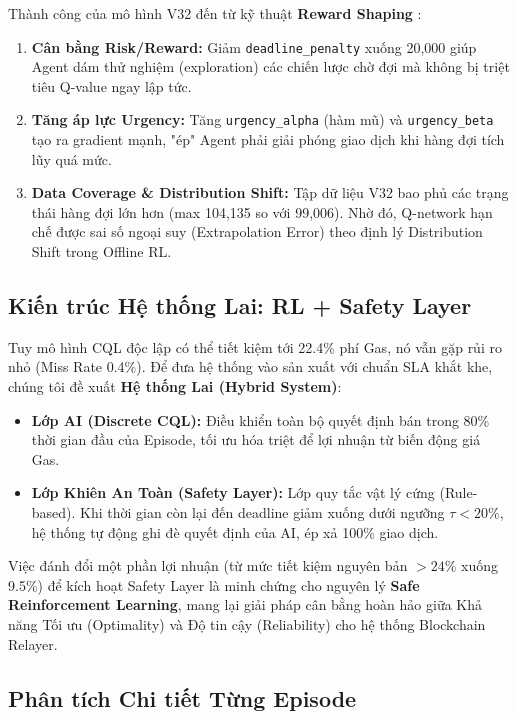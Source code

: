 Thành công của mô hình V32 đến từ kỹ thuật \textbf{Reward Shaping} \cite{ng1999policy}:
\begin{enumerate}
    \item \textbf{Cân bằng Risk/Reward:} Giảm \texttt{deadline\_penalty} xuống 20,000 giúp Agent dám thử nghiệm (exploration) các chiến lược chờ đợi mà không bị triệt tiêu Q-value ngay lập tức.
    \item \textbf{Tăng áp lực Urgency:} Tăng \texttt{urgency\_alpha} (hàm mũ) và \texttt{urgency\_beta} tạo ra gradient mạnh, "ép" Agent phải giải phóng giao dịch khi hàng đợi tích lũy quá mức.
    \item \textbf{Data Coverage \& Distribution Shift:} Tập dữ liệu V32 bao phủ các trạng thái hàng đợi lớn hơn (max 104,135 so với 99,006). Nhờ đó, Q-network hạn chế được sai số ngoại suy (Extrapolation Error) theo định lý Distribution Shift trong Offline RL.
\end{enumerate}

\subsection{Kiến trúc Hệ thống Lai: RL + Safety Layer}

Tuy mô hình CQL độc lập có thể tiết kiệm tới 22.4\% phí Gas, nó vẫn gặp rủi ro nhỏ (Miss Rate 0.4\%). Để đưa hệ thống vào sản xuất với chuẩn SLA khắt khe, chúng tôi đề xuất \textbf{Hệ thống Lai (Hybrid System)}:
\begin{itemize}
    \item \textbf{Lớp AI (Discrete CQL):} Điều khiển toàn bộ quyết định bán trong 80\% thời gian đầu của Episode, tối ưu hóa triệt để lợi nhuận từ biến động giá Gas.
    \item \textbf{Lớp Khiên An Toàn (Safety Layer):} Lớp quy tắc vật lý cứng (Rule-based). Khi thời gian còn lại đến deadline giảm xuống dưới ngưỡng $\tau < 20\%$, hệ thống tự động ghi đè quyết định của AI, ép xả 100\% giao dịch.
\end{itemize}

Việc đánh đổi một phần lợi nhuận (từ mức tiết kiệm nguyên bản $>24\%$ xuống 9.5\%) để kích hoạt Safety Layer là minh chứng cho nguyên lý \textbf{Safe Reinforcement Learning}, mang lại giải pháp cân bằng hoàn hảo giữa Khả năng Tối ưu (Optimality) và Độ tin cậy (Reliability) cho hệ thống Blockchain Relayer.

\subsection{Phân tích Chi tiết Từng Episode}

